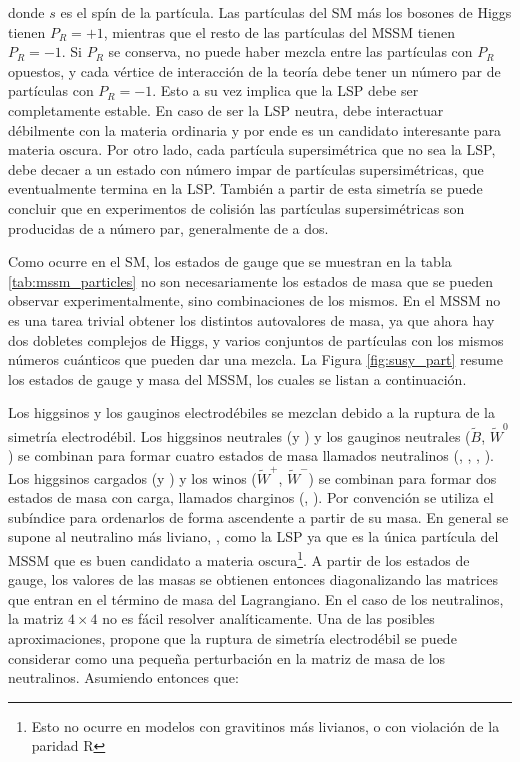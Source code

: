 donde $s$ es el spín de la partícula. Las partículas del SM más los bosones de Higgs tienen $P_R = +1$, mientras que el resto de las partículas del MSSM tienen $P_R = -1$. Si $P_R$ se conserva, no puede haber mezcla entre las partículas con $P_R$ opuestos, y cada vértice de interacción de la teoría debe tener un número par de partículas con $P_R=-1$. Esto a su vez implica que la LSP debe ser completamente estable. En caso de ser la LSP neutra, debe interactuar débilmente con la materia ordinaria y por ende es un candidato interesante para materia oscura. Por otro lado, cada partícula supersimétrica que no sea la LSP, debe decaer a un estado con número impar de partículas supersimétricas, que eventualmente termina en la LSP. También a partir de esta simetría se puede concluir que en experimentos de colisión las partículas supersimétricas son producidas de a número par, generalmente de a dos.





Como ocurre en el SM, los estados de gauge que se muestran en la tabla \ref{tab:mssm_particles} no son necesariamente los estados de masa que se pueden observar experimentalmente, sino combinaciones de los mismos. En el MSSM no es una tarea trivial obtener los distintos autovalores de masa, ya que ahora hay dos dobletes complejos de Higgs, y varios conjuntos de partículas con los mismos números cuánticos que pueden dar una mezcla. La Figura \ref{fig:susy_part} resume los estados de gauge y masa del MSSM, los cuales se listan a continuación.





Los higgsinos y los gauginos electrodébiles se mezclan debido a la ruptura de la simetría electrodébil. Los higgsinos neutrales (\Hinouzero y \Hinodzero) y los gauginos neutrales ($\widetilde{B}$, $\widetilde{W}^0$) se combinan para formar cuatro estados de masa llamados neutralinos (\ninoone, \ninotwo, \ninothree, \ninofour). Los higgsinos cargados (\Hinoup y \Hinodm) y los winos ($\widetilde{W}^+$, $\widetilde{W}^-$) se combinan para formar dos estados de masa con carga, llamados charginos (\chinoonepm, \chinotwopm). Por convención se utiliza el subíndice para ordenarlos de forma ascendente a partir de su masa. En general se supone al neutralino más liviano, \ninoone, como la LSP ya que es la única partícula del MSSM que es buen candidato a materia oscura\footnote{Esto no ocurre en modelos con gravitinos más livianos, o con violación de la paridad R}. A partir de los estados de gauge, los valores de las masas se obtienen entonces diagonalizando las matrices que entran en el término de masa del Lagrangiano. En el caso de los neutralinos, la matriz $4\times4$ no es fácil resolver analíticamente. Una de las posibles aproximaciones, propone que la ruptura de simetría electrodébil se puede considerar como una pequeña perturbación en la matriz de masa de los neutralinos. Asumiendo entonces que: 



